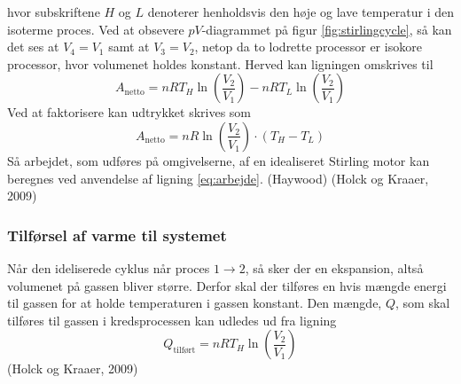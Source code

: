 \documentclass[SRC.tex]{subfiles}
\begin{document}
	hvor subskriftene \(H\) og \(L\) denoterer henholdsvis den høje og lave temperatur i den isoterme
	proces. Ved at obsevere \(pV\)-diagrammet på figur \ref{fig:stirlingcycle}, så kan det ses at \(V_4 = V_1\) samt 
	at \(V_3 = V_2\), netop da to lodrette processor er isokore processor, hvor volumenet holdes konstant. Herved kan ligningen omskrives til
	\begin{equation}
	A_{\text{netto}} = nRT_H\ln\left(\frac{V_2}{V_1}\right)-nRT_L\ln\left(\frac{V_2}{V_1}\right)
	\end{equation}
	Ved at faktorisere kan udtrykket skrives som
	\begin{equation}
		A_{\text{netto}}= nR\ln\left(\frac{V_2}{V_1}\right)\cdot (T_H - T_L)
		\label{eq:arbejde}
	\end{equation}
	Så arbejdet, som udføres på omgivelserne, af en idealiseret Stirling motor kan beregnes ved anvendelse af ligning \eqref{eq:arbejde}.
	(Haywood) (Holck og Kraaer, 2009) 
	
	\subsubsection{Tilførsel af varme til systemet}
	Når den ideliserede cyklus når proces \(1 \rightarrow 2\), så sker der en 
	ekspansion, altså volumenet på gassen bliver større. Derfor skal der tilføres en hvis mængde 
	energi til gassen for at holde temperaturen i gassen konstant. Den mængde, \(Q\), som skal tilføres til gassen i kredsprocessen kan udledes ud fra ligning
	\begin{equation}
		Q_{\text{tilført}} = nRT_H\ln\left(\frac{V_2}{V_1}\right)
		\label{eq:varme}
	\end{equation}
	(Holck og Kraaer, 2009) 
	 
\end{document}
